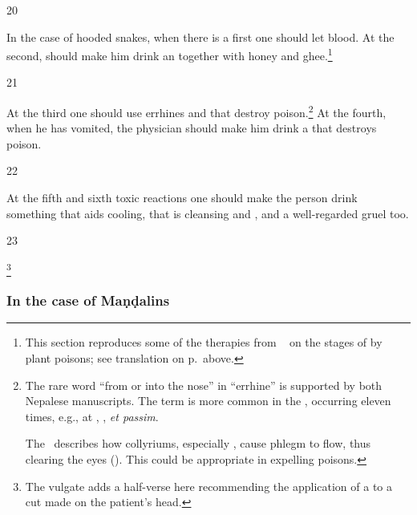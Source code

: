 \begin{translation}
\item [20]

In the case of hooded snakes, when there is a 
first one should let blood.  At the second,  should make him drink an 
 together with honey and ghee.\footnote{This
    section reproduces some of the therapies from  \SS\ 
    on the stages of  by plant poisons; see
    translation on p.\,\pageref{dusivisa} above.}
    

\item [21]

At the third one should use errhines and  that destroy
poison.\footnote{%
The rare word  “from or
    into the nose” in  “errhine” is supported by both
    Nepalese manuscripts.  The term is more common in the \CS, occurring
    eleven times, e.g., at , , \emph{et
    passim}.  
    
    The \CS\ describes how collyriums, especially , cause
phlegm to flow, thus clearing the eyes ().
This could be appropriate in expelling poisons.} At the fourth, when he
has vomited, the physician should make him drink a 
that destroys poison.

\item [22]

At the fifth and sixth toxic reactions one should make 
the
person drink something that aids cooling, that is cleansing
and , and a well-regarded gruel too.


    
\item [23]

\footnote{The vulgate adds a half-verse here recommending
    the application of a  to a cut made on the patient's 
    head.}


\subsubsection{In the case of Maṇḍalins}


\end{translation}
